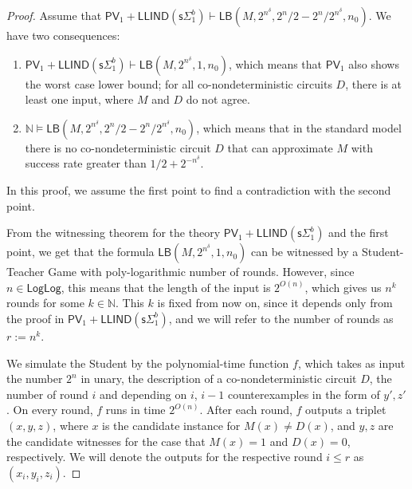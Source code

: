 \documentclass[11pt]{article}
\newcommand{\N}{\mathbb{N}}
\newcommand{\PV}{\mathsf{PV}}
\theoremstyle{definition}
\theoremstyle{definition}
\theoremstyle{remark}
\begin{document}
\begin{proof}
    Assume that $\PV_1+\mathsf{LLIND}(\mathsf{s}\Sigma^b_1)\vdash \mathsf{LB}(M,2^{n^\delta},2^n/2-2^n/2^{n^\delta},n_0)$. We have two consequences:
    \begin{enumerate}
        \item $\PV_1+\mathsf{LLIND}(\mathsf{s}\Sigma^b_1)\vdash \mathsf{LB}(M,2^{n^\delta},1,n_0)$, which means that $\PV_1$ also shows the worst case lower bound; for all co-nondeterministic circuits $D$, there is at least one input, where $M$ and $D$ do not agree.
        \item $\N\models \mathsf{LB}(M,2^{n^\delta},2^n/2-2^n/2^{n^\delta},n_0)$, which means that in the standard model there is no co-nondeterministic circuit $D$ that can approximate $M$ with success rate greater than $1/2+2^{-n^\delta}$.
    \end{enumerate}
    In this proof, we assume the first point to find a contradiction with the second point.

    From the witnessing theorem for the theory $\PV_1+\mathsf{LLIND}(\mathsf{s}\Sigma^b_1)$ and the first point, we get that the formula $\mathsf{LB}(M,2^{n^\delta},1,n_0)$ can be witnessed by a Student-Teacher Game with poly-logarithmic number of rounds. However, since $n\in \mathsf{LogLog}$, this means that the length of the input is $2^{O(n)}$, which gives us $n^k$ rounds for some $k\in \N$. This $k$ is fixed from now on, since it depends only from the proof in $\PV_1+\mathsf{LLIND}(\mathsf{s}\Sigma^b_1)$, and we will refer to the number of rounds as $r:=n^k$.

    We simulate the Student by the polynomial-time function $f$, which takes as input the number $2^n$ in unary, the description of a co-nondeterministic circuit $D$, the number of round $i$ and depending on $i$, $i-1$ counterexamples in the form of $y',z'$. On every round, $f$ runs in time $2^{O(n)}$.
    After each round, $f$ outputs a triplet $(x,y,z)$, where $x$ is the candidate instance for $M(x)\neq D(x)$, and $y,z$ are the candidate witnesses for the case that $M(x)=1$ and $D(x)=0$, respectively. We will denote the outputs for the respective round $i\leq r$ as $(x_i,y_i,z_i)$.


\end{proof}
\end{document}
